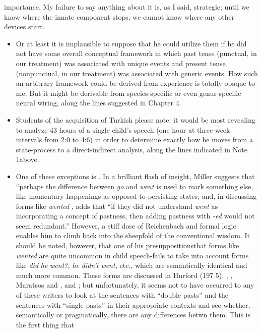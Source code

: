 
importance. My failure to say anything about it is, as I said, strategic; until we know where the innate component stops, we cannot know where any other devices start.

\begin{itemize}
\item Or at least it is implausible to suppose that he could utilize them if he did not have some overall conceptual framework in which past tense (punctual, in our treatment) was associated with unique events and present tense (nonpunctual, in our treatment) was associ\-ated with generic events. How such an arbitrary framework could be derived from experience is totally opaque to me. But it might be derivable from species-specific or even genus-specific neural wiring, along the lines suggested in Chapter 4.
\item Students of the acquisition of Turkish please note: it would be most revealing to analyze 43 hours of a single child's speech (one hour at three-week intervals from 2:0 to 4:6) in order to determine exactly how he moves from a state-process to a direct-indirect analysis, along the lines indicated in Note 1above.
\item One of these exceptions is \citet{Miller1978}. In a brilliant flash of insight, Miller suggests that ``perhaps the difference between \textit{go} and \textit{went} is used to mark something else, like momentary happen\-ings as opposed to persisting states{\textquotedbl}; and, in discussing forms like \textit{wented} , adds that ``if they did not understand \textit{went} as incorporating a concept of pastness, then adding pastness with \textit{{}-ed} would not seem redundant.'' However, a stiff dose of Reichenbach and formal logic enables him to climb back into the sheepfold of the conventional wisdom. It should be noted, however, that one of his presuppositions\-that forms like \textit{wented} are quite uncommon in child speech-fails to take into account forms like \textit{did} \textit{he} \textit{went?,} \textit{he} \textit{didn't} \textit{went,} etc., which are semantically identical and much more common. These forms are discussed in Hurford (197 5), \citet{Kuczaj1976}, \citet{Fay1978}, Maratsos and \citet{Kuczaj1978}, and \citet{ErreichEtAl1980}; but unfortunately, it seems not to have occurred to any of these writers to look at the sentences with ``double pasts'' and the sentences with ``single pasts'' in their appropriate contexts and see whether, semantically or pragmatically, there are any differences betwn them. This is the first thing rhat
\end{itemize}

